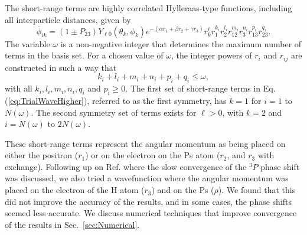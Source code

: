 \documentclass[preprint,showpacs,showkeys,preprintnumbers,amsmath,amssymb,longbibliography,pra,aps]{revtex4-1}
\newcommand{\todoi}{\todo[inline]}
\begin{document}
The short-range terms are highly correlated Hylleraas-type functions, including
all interparticle distances, given by
\begin{equation}
\label{eq:PhiDef}
\bar{\phi}_{ik} = \left(1 \pm P_{23}\right) Y_{\ell 0}(\theta_k,\phi_k)
e^{-(\alpha r_1 + \beta r_2 + \gamma r_3)}
r_k^{\ell} r_1^{k_i} r_2^{l_i} r_{12}^{m_i} r_3^{n_i} r_{13}^{p_i} r_{23}^{q_i}.
\end{equation}
The variable $\omega$ is a non-negative integer that determines the maximum
number of terms in the basis set. For a chosen value of $\omega$, the integer
powers of $r_i$ and $r_{ij}$ are constructed in such a way that 
\begin{equation}
k_i + l_i + m_i + n_i + p_i + q_i \leq \omega,
\end{equation}
with all $k_i, l_i, m_i, n_i, q_i$ and $p_i \geq 0$.
The first set of short-range terms in Eq. (\ref{eq:TrialWaveHigher}), referred
to as the first symmetry, has $k=1$ for $i=1$ to $N(\omega)$. The second
symmetry set of terms exists for $\ell > 0$, with $k=2$ and $i = N(\omega)$ to
$2N(\omega)$.

These short-range terms represent the angular momentum as being placed on 
either the positron ($r_1$) or on the electron on the Ps atom ($r_2$, and $r_3$
with exchange). Following up on Ref. \cite{VanReeth2004} where the slow 
convergence of the $^3P$ phase shift was discussed, we also tried a 
wavefunction where the angular momentum was placed on the electron of the H 
atom ($r_3$) and on the Ps ($\rho$). We found that this did not improve the
accuracy of the results, and in some cases, the phase shifts seemed less
accurate. We discuss numerical techniques that improve convergence of the
results in Sec.~\ref{sec:Numerical}.

\end{document}

